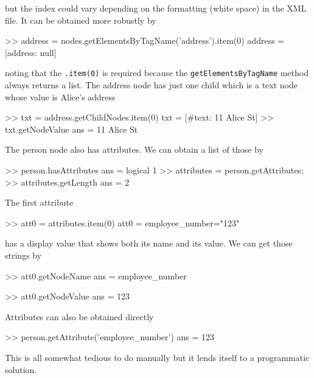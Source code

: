 but the index could vary depending on the formatting (white space) in the XML file.  It can be obtained more robustly by
\begin{Code}
>> address = nodes.getElementsByTagName('address').item(0)
address =
[address: null]
\end{Code}
noting that the \texttt{.item(0)} is required because the \texttt{getElementsByTagName} method always returns a list.
The address node has just one child which is a text node whose value is Alice's address
\begin{Code}
>> txt = address.getChildNodes.item(0)
txt =
[#text: 11 Alice St]
>> txt.getNodeValue
ans =
11 Alice St
\end{Code}

The person node also has attributes.  We can obtain a list of those by
\begin{Code}
>> person.hasAttributes
ans =  logical
   1
>> attributes = person.getAttributes;
>> attributes.getLength
ans =
     2
\end{Code}
The first attribute
\begin{Code}
>> att0 = attributes.item(0)
att0 =
employee_number="123"
\end{Code}
has a display value that shows both its name and its value.
We can get those strings by
\begin{Code}
>> att0.getNodeName
ans =
employee_number

>> att0.getNodeValue
ans =
123
\end{Code}

Attributes can also be obtained directly
\begin{Code}
>> person.getAttribute('employee_number')
ans =
123
\end{Code}

This is all somewhat tedious to do manually but it lends itself to a programmatic solution.
